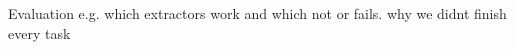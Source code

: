\begin{frame}{Evaluation}
	e.g. which extractors work and which not
	or fails. why we didnt finish every task
\end{frame}